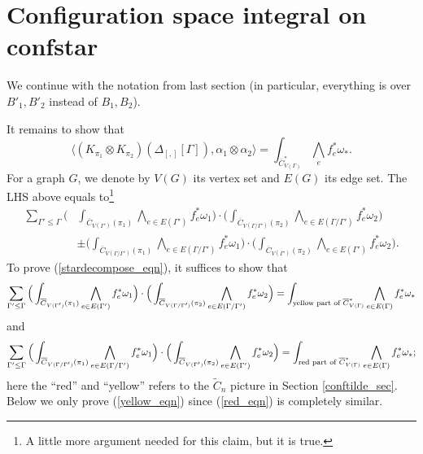 \documentclass[11pt]{article}
\theoremstyle{definition}
\theoremstyle{remark}
\def\wt#1{\widetilde{#1}}
\def\ov#1{\overline{#1}}
\def\tn#1{\textnormal{#1}}
\begin{document}
\section{Configuration space integral on confstar}

We continue with the notation from last section (in particular, everything is over $B'_1, B'_2$ instead of $B_1, B_2$). 

It remains to show that 
\begin{equation}\label{stardecompose_eqn}
\big\langle (K_{\pi_1}\otimes K_{\pi_2})(\Delta_{[,]}[\Gamma]), \alpha_1\otimes\alpha_2 \big\rangle=
\int_{\ov{C}^*_{V(\Gamma)}}\bigwedge_{e}f_e^*{\omega_*}. 
\end{equation}
For a graph $G$, we denote by $V(G)$ its vertex set and $E(G)$ its edge set. 
The LHS above equals to\footnote{
A little more argument needed for this claim, but it is true.} 
\begin{align*}
\sum_{\Gamma'\le\Gamma}
\Big(&\int_{\ov{C}_{V(\Gamma')}(\pi_1)}
\bigwedge_{e\in E(\Gamma')}f_e^*\omega_1\Big)
\cdot
\Big(\int_{\ov{C}_{V(\Gamma/\Gamma')}(\pi_2)}
\bigwedge_{e\in E(\Gamma/\Gamma')}f_e^*\omega_2\Big)\\
&\pm
\Big(\int_{\ov{C}_{V(\Gamma/\Gamma')}(\pi_1)}
\bigwedge_{e\in E(\Gamma/\Gamma')}f_e^*\omega_1\Big)
\cdot
\Big(\int_{\ov{C}_{V(\Gamma')}(\pi_2)}
\bigwedge_{e\in E(\Gamma')}f_e^*\omega_2\Big).
\end{align*}
To prove (\ref{stardecompose_eqn}), it suffices to show that 
\begin{equation}\label{yellow_eqn}
\sum_{\Gamma'\le\Gamma}
\Big(\int_{\ov{C}_{V(\Gamma')}(\pi_1)}
\bigwedge_{e\in E(\Gamma')}f_e^*\omega_1\Big)
\cdot
\Big(\int_{\ov{C}_{V(\Gamma/\Gamma')}(\pi_2)}
\bigwedge_{e\in E(\Gamma/\Gamma')}f_e^*\omega_2\Big)=
\int_{\tn{yellow part of }\ov{C}^*_{V(\Gamma)}}\bigwedge_{e\in E(\Gamma)}f_e^*{\omega_*}
\end{equation}
and 
\begin{equation}\label{red_eqn}
\sum_{\Gamma'\le\Gamma}
\Big(\int_{\ov{C}_{V(\Gamma/\Gamma')}(\pi_1)}
\bigwedge_{e\in E(\Gamma/\Gamma')}f_e^*\omega_1\Big)
\cdot
\Big(\int_{\ov{C}_{V(\Gamma')}(\pi_2)}
\bigwedge_{e\in E(\Gamma')}f_e^*\omega_2\Big)=
\int_{\tn{red part of }\ov{C}^*_{V(\Gamma)}}\bigwedge_{e\in E(\Gamma)}f_e^*{\omega_*};
\end{equation}
here the ``red'' and ``yellow'' refers to the $\wt{C}_n$ picture in Section \ref{conftilde_sec}. 
Below we only prove (\ref{yellow_eqn}) since (\ref{red_eqn}) is completely similar. 
\end{document}
